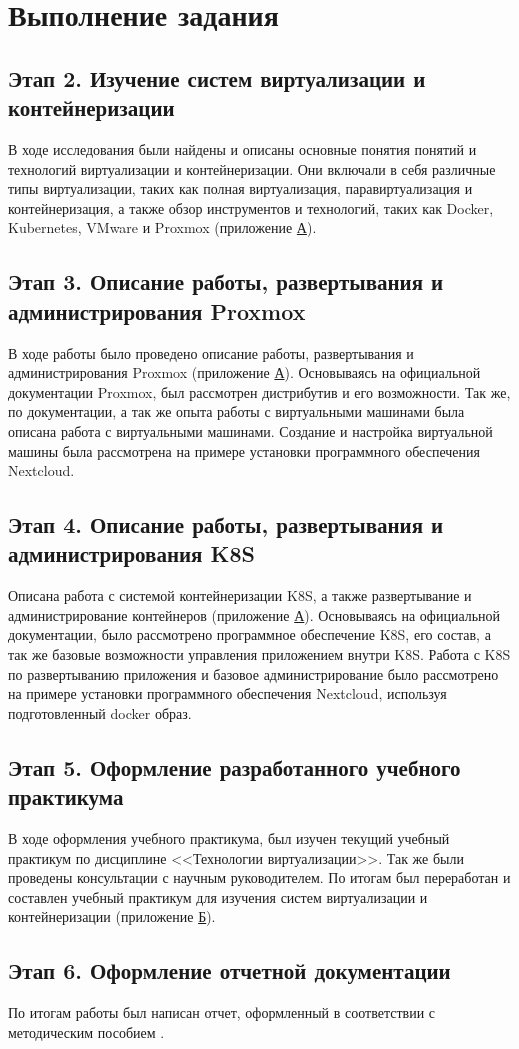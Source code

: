 \section{Выполнение задания}

\subsection{Этап 2. Изучение систем виртуализации и контейнеризации}
В ходе исследования были найдены и описаны основные понятия понятий и технологий виртуализации и контейнеризации.
Они включали в себя различные типы виртуализации, таких как полная виртуализация, 
паравиртуализация и контейнеризация, а также обзор инструментов и технологий, таких как Docker, 
Kubernetes, VMware и Proxmox (приложение \hyperlink{app-a}{А}). 

\subsection{Этап 3. Описание работы, развертывания и администрирования Proxmox}
В ходе работы было проведено описание работы, развертывания и администрирования Proxmox (приложение \hyperlink{app-a}{А}).
Основываясь на официальной документации Proxmox, был рассмотрен дистрибутив и его возможности. Так же, по
документации, а так же опыта работы с виртуальными машинами была описана работа с виртуальными машинами. 
Создание и настройка виртуальной машины была рассмотрена на примере установки программного обеспечения Nextcloud.

\subsection{Этап 4. Описание работы, развертывания и администрирования K8S}
Описана работа с системой контейнеризации K8S, а также развертывание и администрирование контейнеров (приложение \hyperlink{app-a}{А}).
Основываясь на официальной документации, было рассмотрено программное обеспечение K8S, его состав, а так же
базовые возможности управления приложением внутри K8S.
Работа с K8S по развертыванию приложения и базовое администрирование было рассмотрено на примере установки программного обеспечения Nextcloud, 
используя подготовленный docker образ.

\subsection{Этап 5. Оформление разработанного учебного практикума}
В ходе оформления учебного практикума, был изучен текущий учебный практикум по дисциплине <<Технологии виртуализации>>.
Так же были проведены консультации с научным руководителем.
По итогам был переработан и составлен учебный практикум для изучения систем виртуализации и контейнеризации (приложение \hyperlink{app-b}{Б}).

\subsection{Этап 6. Оформление отчетной документации}
По итогам работы был написан отчет, оформленный в соответствии с методическим пособием \cite{markina}.

\clearpage
